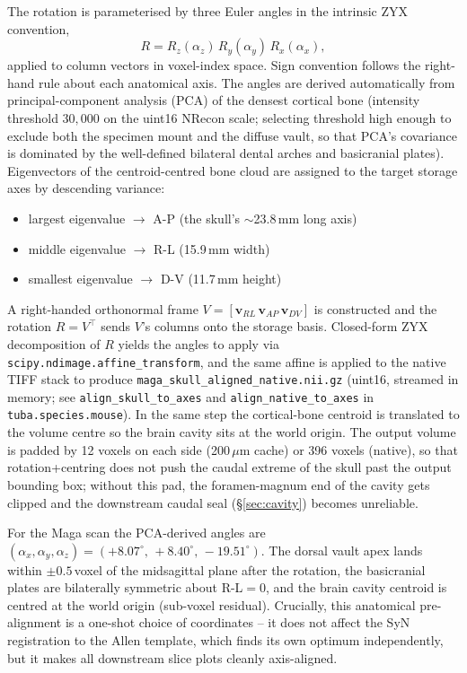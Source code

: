 \documentclass{compactarticle}
\begin{document}
The rotation is parameterised by three Euler angles in the intrinsic
ZYX convention,
\begin{equation}
R = R_z(\alpha_z)\,R_y(\alpha_y)\,R_x(\alpha_x),
\end{equation}
applied to column vectors in voxel-index space. Sign convention follows
the right-hand rule about each anatomical axis. The angles are derived
automatically from principal-component analysis (PCA) of the densest
cortical bone (intensity threshold $30{,}000$ on the uint16 NRecon
scale; selecting threshold high enough to exclude both the specimen
mount and the diffuse vault, so that PCA's covariance is dominated by
the well-defined bilateral dental arches and basicranial plates).
Eigenvectors of the centroid-centred bone cloud are assigned to the
target storage axes by descending variance:
\begin{itemize}
\setlength\itemsep{0pt}
  \item largest eigenvalue $\to$ A-P (the skull's $\sim$23.8\,mm long axis)
  \item middle eigenvalue $\to$ R-L (15.9\,mm width)
  \item smallest eigenvalue $\to$ D-V (11.7\,mm height)
\end{itemize}
A right-handed orthonormal frame $V = [\mathbf v_{RL}\,\mathbf v_{AP}\,
\mathbf v_{DV}]$ is constructed and the rotation $R = V^{\!\top}$ sends
$V$'s columns onto the storage basis. Closed-form ZYX decomposition of
$R$ yields the angles to apply via
\texttt{scipy.ndimage.affine\_transform}, and the same affine is
applied to the native TIFF stack to produce
\texttt{maga\_skull\_aligned\_native.\allowbreak nii.gz} (uint16,
streamed in memory; see
\texttt{align\_skull\_to\_axes} and \texttt{align\_native\_to\_axes} in
\texttt{tuba.species.mouse}). In the same step the cortical-bone
centroid is translated to the volume centre so the brain cavity sits at
the world origin. The output volume is padded by 12 voxels on each
side (200\,$\mu$m cache) or 396 voxels (native), so that
rotation+centring does not push the caudal extreme of the skull past
the output bounding box; without this pad, the foramen-magnum end of
the cavity gets clipped and the downstream caudal seal (\S\ref{sec:cavity})
becomes unreliable.

For the Maga scan the PCA-derived angles are
$(\alpha_x,\alpha_y,\alpha_z) = ({+}8.07^\circ,\,{+}8.40^\circ,\,
{-}19.51^\circ)$. The dorsal vault apex lands within
$\pm 0.5$\,voxel of the midsagittal plane after the rotation, the
basicranial plates are bilaterally symmetric about R-L${=}0$, and the
brain cavity centroid is centred at the world origin (sub-voxel
residual). Crucially, this anatomical pre-alignment is a one-shot
choice of coordinates -- it does not affect the SyN registration to the
Allen template, which finds its own optimum independently, but it makes
all downstream slice plots cleanly axis-aligned.
\end{document}
